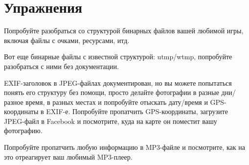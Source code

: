 \section{Упражнения}

Попробуйте разобраться со структурой бинарных файлов вашей любимой игры, включая файлы с очками, ресурсами, итд.

Вот еще бинарные файлы с известной структурой: utmp/wtmp, попробуйте разобраться с ними без документации.

EXIF-заголовок в JPEG-файлах документирован, но вы можете попытаться понять его структуру без помощи, просто делайте
фотографии в разные дни/разное время, в разных местах и попробуйте отыскать дату/время и GPS-координаты в EXIF-е.
Попробуйте пропатчить GPS-координаты, загрузите JPEG-файл в Facebook и посмотрите, куда на карте он поместит вашу
фотографию.

Попробуйте пропатчить любую информацию в MP3-файле и посмотрите, как на это отреагирует ваш любимый MP3-плеер.

